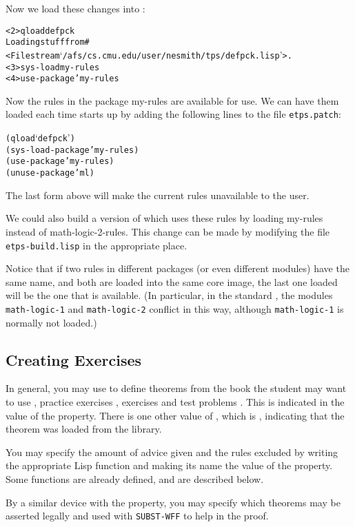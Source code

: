 Now we load these changes into {\ETPS}:
\begin{alltt}
<2> qload defpck
Loading stuff from \#<File stream `/afs/cs.cmu.edu/user/nesmith/tps/defpck.lisp'>.
<3> sys-load my-rules
<4> use-package 'my-rules
\end{alltt}

Now the rules in the package my-rules are available for use.  We can have them
loaded each time {\ETPS} starts up by adding the following lines to the
file {\tt etps.patch}:
\begin{alltt}
(qload `defpck')
(sys-load-package 'my-rules)
(use-package 'my-rules)
(unuse-package 'ml)
\end{alltt}

The last form above will make the current rules unavailable to the user.

We could also build a version of {\ETPS} which uses these rules by loading
my-rules instead of math-logic-2-rules.  This change can be made by
modifying the file {\tt etps-build.lisp} in the appropriate place.

Notice that if two rules in different packages (or even different modules)
have the same name, and both are loaded into the same core image, the last one
loaded will be the one that is available. (In particular, in the standard {\TPS},
the modules {\tt math-logic-1} and {\tt math-logic-2} conflict in this way, although
{\tt math-logic-1} is normally not loaded.)

\subsection{Creating Exercises}

In general, you may use  to define theorems from the book
the student may want to use , practice exercises ,
exercises  and test problems . This is indicated
in the value of the  property. There is one other value of ,
which is , indicating that the theorem was loaded from the library.

You may specify the amount of advice given and the rules excluded by writing
the appropriate Lisp function and making its name the value of the
 property. Some functions are already defined, and are described below.

By a similar device with the  property,
you may specify which theorems may be asserted legally and used with
{\tt SUBST-WFF} to help in the proof.

